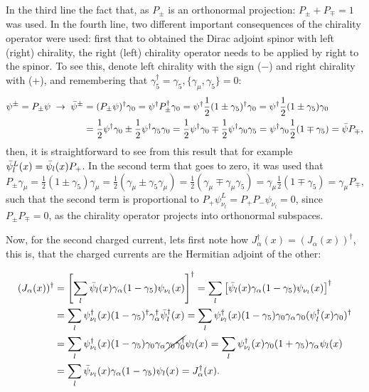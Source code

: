In the third line the fact that, as $P_{\pm}$ is an orthonormal projection: $P_{\pm} + P_{\mp} = 1$ was used. In the fourth line, two different important consequences of the chirality operator were used: first that to obtained the Dirac adjoint spinor with left (right) chirality, the right (left) chirality operator needs to be applied by right to the spinor. To see this, denote left chirality with the sign ($-$) and right chirality with (+), and remembering that $\gamma_5^{\dagger} = \gamma_5, \{\gamma_{\mu},\gamma_5\} = 0$:
\begin{align*}
    \psi^{\pm} = P_{\pm}\psi \; \rightarrow \; \Bar{\psi}^{\pm} &= (P_{\pm}\psi)^{\dagger}\gamma_0 = \psi^{\dagger}P_{\pm}^{\dagger}\gamma_0 = \psi^{\dagger}\dfrac{1}{2}(1\pm\gamma_5)^{\dagger}\gamma_0 = \psi^{\dagger}\dfrac{1}{2}(1\pm\gamma_5)\gamma_0 \\
    &= \dfrac{1}{2}\psi^{\dagger}\gamma_0 \pm \dfrac{1}{2}\psi^{\dagger}\gamma_5\gamma_0 = \dfrac{1}{2}\psi^{\dagger}\gamma_0 \mp \dfrac{1}{2}\psi^{\dagger}\gamma_0\gamma_5 = \psi^{\dagger}\gamma_0\dfrac{1}{2}(1 \mp \gamma_5) = \Bar{\psi}P_{\mp},
\end{align*}
then, it is straightforward to see from this result that for example $\Bar{\psi}^L_l(x) = \Bar{\psi}_l(x)P_+$. In the second term that goes to zero, it was used that $P_{\pm}\gamma_{\mu} = \frac{1}{2}(1\pm\gamma_5)\gamma_{\mu} = \frac{1}{2}(\gamma_{\mu} \pm \gamma_{5}\gamma_{\mu}) = \frac{1}{2}(\gamma_{\mu} \mp \gamma_{\mu}\gamma_5) = \gamma_{\mu}\frac{1}{2}(1\mp\gamma_5) = \gamma_{\mu}P_{\mp}$, such that the second term is proportional to $P_+\psi^L_{\nu_l} = P_+P_-\psi_{\nu_l} = 0$, since $P_{\pm}P_{\mp} = 0$, as the chirality operator projects into orthonormal subspaces.

Now, for the second charged current, lets first note how $J^{\dagger}_{\alpha}(x) = (J_{\alpha}(x))^{\dagger}$, this is, that the charged currents are the Hermitian adjoint of the other:

\begin{align*}
    (J_{\alpha}(x))^{\dagger} &= \left[\sum_l \Bar{\psi}_l(x)\gamma_{\alpha}(1-\gamma_5)\psi_{\nu_l}(x)\right]^{\dagger} = \sum_l \left[\Bar{\psi}_l(x)\gamma_{\alpha}(1-\gamma_5)\psi_{\nu_l}(x)\right]^{\dagger} \\
    &= \sum_l \psi_{\nu_l}^{\dagger}(x)(1-\gamma_5)^{\dagger}\gamma_{\alpha}^{\dagger}\Bar{\psi}_l^{\dagger}(x) = \sum_l \psi_{\nu_l}^{\dagger}(x)(1-\gamma_5)\gamma_0\gamma_{\alpha}\gamma_0(\psi_l^{\dagger}(x)\gamma_0)^{\dagger} \\
    &= \sum_l \psi_{\nu_l}^{\dagger}(x)(1-\gamma_5)\gamma_0\gamma_{\alpha}\cancel{\gamma_0\gamma_0^{\dagger}}\psi_l(x) = \sum_l \psi_{\nu_l}^{\dagger}(x)\gamma_0(1+\gamma_5)\gamma_{\alpha}\psi_l(x) \\
    &= \sum_l \Bar{\psi}_{\nu_l}(x)\gamma_{\alpha}(1-\gamma_5)\psi_l(x) = J^{\dagger}_{\alpha}(x).
\end{align*}

